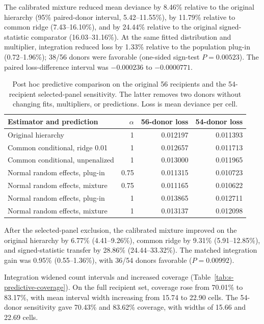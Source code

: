 \documentclass[10pt,a4paper]{article}
\begin{document}
The calibrated mixture reduced mean deviance by 8.46\% relative to the
original hierarchy (95\% paired-donor interval, 5.42--11.55\%), by
11.79\% relative to common ridge (7.43--16.10\%), and by 24.44\%
relative to the original signed-statistic comparator (16.03--31.16\%).
At the same fitted distribution and multiplier, integration reduced loss
by 1.33\% relative to the population plug-in (0.72--1.96\%); 38/56 donors
were favorable (one-sided sign-test $P=0.00523$). The paired loss-difference
interval was $-0.000236$ to $-0.0000771$.

\begin{table}[ht]
\centering\small
\caption{Post hoc predictive comparison on the original 56 recipients and
the 54-recipient selected-panel sensitivity. The latter removes two donors
without changing fits, multipliers, or predictions. Loss is mean deviance
per cell.}
\label{tab:s-predictive-loss}
\begin{tabular}{@{}lrrr@{}}
\toprule
Estimator and prediction & $\alpha$ & 56-donor loss & 54-donor loss\\
\midrule
Original hierarchy & 1 & 0.012197 & 0.011393\\
Common conditional, ridge 0.01 & 1 & 0.012657 & 0.011713\\
Common conditional, unpenalized & 1 & 0.013000 & 0.011965\\
Normal random effects, plug-in & 0.75 & 0.011315 & 0.010723\\
Normal random effects, mixture & 0.75 & 0.011165 & 0.010622\\
Normal random effects, plug-in & 1 & 0.013865 & 0.012711\\
Normal random effects, mixture & 1 & 0.013137 & 0.012098\\
\bottomrule
\end{tabular}
\end{table}

After the selected-panel exclusion, the calibrated mixture improved on the
original hierarchy by 6.77\% (4.41--9.26\%), common ridge by 9.31\%
(5.91--12.85\%), and signed-statistic transfer by 28.86\%
(24.44--33.32\%). The matched integration gain was 0.95\%
(0.55--1.36\%), with 36/54 donors favorable ($P=0.00992$).

Integration widened count intervals and increased coverage
(Table~\ref{tab:s-predictive-coverage}). On the full recipient set, coverage
rose from 70.01\% to 83.17\%, with mean interval width increasing from
15.74 to 22.90 cells. The 54-donor sensitivity gave 70.43\% and 83.62\%
coverage, with widths of 15.66 and 22.69 cells.
\end{document}
